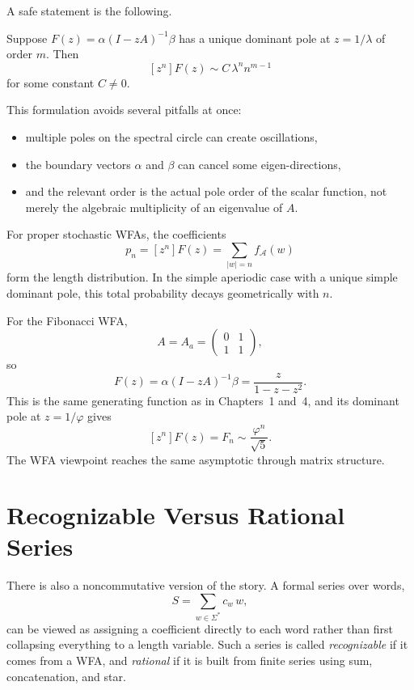 A safe statement is the following.

\begin{proposition}
Suppose $F(z)=\alpha(I-zA)^{-1}\beta$ has a unique dominant pole at $z=1/\lambda$ of order $m$. Then
\[
  [z^n]F(z) \sim C\,\lambda^n n^{m-1}
\]
for some constant $C \ne 0$.
\end{proposition}

This formulation avoids several pitfalls at once:
\begin{itemize}
  \item multiple poles on the spectral circle can create oscillations,
  \item the boundary vectors $\alpha$ and $\beta$ can cancel some eigen-directions,
  \item and the relevant order is the actual pole order of the scalar function, not merely the algebraic multiplicity of an eigenvalue of $A$.
\end{itemize}

For proper stochastic WFAs, the coefficients
\[
  p_n = [z^n]F(z) = \sum_{|w|=n} f_{\mathcal A}(w)
\]
form the length distribution. In the simple aperiodic case with a unique simple dominant pole, this total probability decays geometrically with $n$.

\begin{example}
For the Fibonacci WFA,
\[
  A = A_a = \begin{pmatrix}0 & 1\\1 & 1\end{pmatrix},
\]
so
\[
  F(z) = \alpha(I-zA)^{-1}\beta = \frac{z}{1-z-z^2}.
\]
This is the same generating function as in Chapters~1 and~4, and its dominant pole at $z=1/\varphi$ gives
\[
  [z^n]F(z) = F_n \sim \frac{\varphi^n}{\sqrt{5}}.
\]
The WFA viewpoint reaches the same asymptotic through matrix structure.
\end{example}

\section{Recognizable Versus Rational Series}

There is also a noncommutative version of the story. A formal series over words,
\[
  S = \sum_{w \in \Sigma^*} c_w \, w,
\]
can be viewed as assigning a coefficient directly to each word rather than first collapsing everything to a length variable. Such a series is called \emph{recognizable} if it comes from a WFA, and \emph{rational} if it is built from finite series using sum, concatenation, and star.

